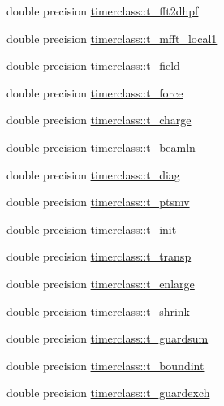 \begin{DoxyCompactItemize}
double precision \mbox{\hyperlink{namespacetimerclass_a853c2d6920418548ad54bd15e9f822a1}{timerclass\+::t\+\_\+fft2dhpf}}
\item 
double precision \mbox{\hyperlink{namespacetimerclass_ab7ead1f16d3ab25623889ad5459d9ce1}{timerclass\+::t\+\_\+mfft\+\_\+local1}}
\item 
double precision \mbox{\hyperlink{namespacetimerclass_a17175fbcc799b0ea8174c970b128e1b5}{timerclass\+::t\+\_\+field}}
\item 
double precision \mbox{\hyperlink{namespacetimerclass_accf4dcea0dd48030e848ec7af2f1e30c}{timerclass\+::t\+\_\+force}}
\item 
double precision \mbox{\hyperlink{namespacetimerclass_a3c92f057232df785c821c8340801e508}{timerclass\+::t\+\_\+charge}}
\item 
double precision \mbox{\hyperlink{namespacetimerclass_a3dea6c858addd80b0f3ffa23635e58ee}{timerclass\+::t\+\_\+beamln}}
\item 
double precision \mbox{\hyperlink{namespacetimerclass_a014cdbd0d72a928c7d6307b246671522}{timerclass\+::t\+\_\+diag}}
\item 
double precision \mbox{\hyperlink{namespacetimerclass_ad87bfd792cca542e63e5888518d15f74}{timerclass\+::t\+\_\+ptsmv}}
\item 
double precision \mbox{\hyperlink{namespacetimerclass_ac02821c26e6c5b8fe3ce7df142bedd47}{timerclass\+::t\+\_\+init}}
\item 
double precision \mbox{\hyperlink{namespacetimerclass_a6ada82fea692f0dbd703888ffbd44214}{timerclass\+::t\+\_\+transp}}
\item 
double precision \mbox{\hyperlink{namespacetimerclass_a95e3a3f478de91de1ebd380edef137ae}{timerclass\+::t\+\_\+enlarge}}
\item 
double precision \mbox{\hyperlink{namespacetimerclass_a78620c6678e30a2cd4796a31b2f718ff}{timerclass\+::t\+\_\+shrink}}
\item 
double precision \mbox{\hyperlink{namespacetimerclass_abfb4952ad8c64a2985930df8e27025de}{timerclass\+::t\+\_\+guardsum}}
\item 
double precision \mbox{\hyperlink{namespacetimerclass_ad0e0d8ccf1da4567018453934b6c5795}{timerclass\+::t\+\_\+boundint}}
\item 
double precision \mbox{\hyperlink{namespacetimerclass_a555d18ed5df532a56a58498c3915a778}{timerclass\+::t\+\_\+guardexch}}
\end{DoxyCompactItemize}
